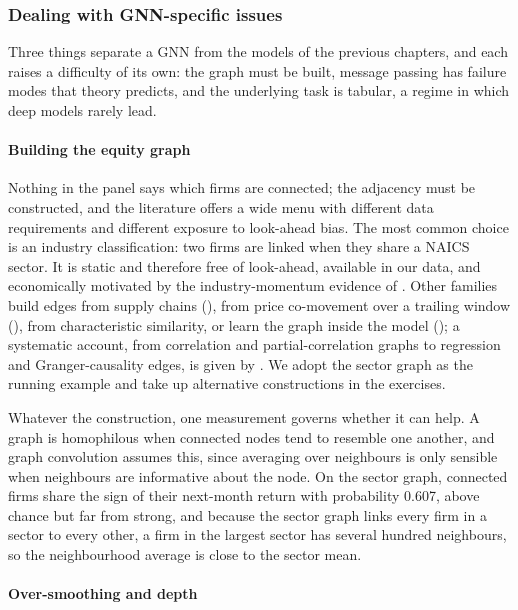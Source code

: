 \subsubsection{Dealing with GNN-specific issues}\label{sec_gnn_issues}

Three things separate a GNN from the models of the previous chapters, and each raises a difficulty of its own: the graph must be built, message passing has failure modes that theory predicts, and the underlying task is tabular, a regime in which deep models rarely lead.

\paragraph{Building the equity graph}\label{sec_gnn_building}

Nothing in the panel says which firms are connected; the adjacency must be constructed, and the literature offers a wide menu with different data requirements and different exposure to look-ahead bias. The most common choice is an industry classification: two firms are linked when they share a NAICS sector. It is static and therefore free of look-ahead, available in our data, and economically motivated by the industry-momentum evidence of \cite{moskowitz1999industries}. Other families build edges from supply chains (\cite{cohen2008economic}), from price co-movement over a trailing window (\cite{xiang2022temporal}), from characteristic similarity, or learn the graph inside the model (\cite{cheng2021modeling}); a systematic account, from correlation and partial-correlation graphs to regression and Granger-causality edges, is given by \cite{konstantinov2025network}. We adopt the sector graph as the running example and take up alternative constructions in the exercises.

Whatever the construction, one measurement governs whether it can help. A graph is homophilous when connected nodes tend to resemble one another, and graph convolution assumes this, since averaging over neighbours is only sensible when neighbours are informative about the node. On the sector graph, connected firms share the sign of their next-month return with probability 0.607, above chance but far from strong, and because the sector graph links every firm in a sector to every other, a firm in the largest sector has several hundred neighbours, so the neighbourhood average is close to the sector mean.

\paragraph{Over-smoothing and depth}\label{sec_gnn_smoothing}

